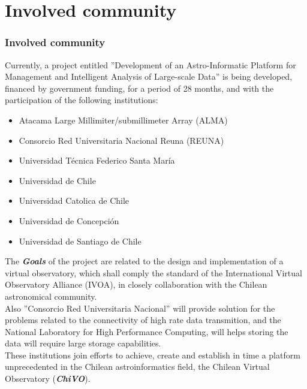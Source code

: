 \section{Involved community}

\begin{frame}
\frametitle{Involved community}
Currently, a project entitled ”Development of an Astro-Informatic Platform for Management and
Intelligent Analysis of Large-scale Data” is being developed, financed by government funding, for a period of 28 months,
and with the participation of the following institutions:
\begin{itemize}
	\addtolength{\itemindent}{1cm}
	\item Atacama Large Millimiter/submillimeter Array (ALMA)
	\item Consorcio Red Universitaria Nacional Reuna (REUNA)
	\item Universidad Técnica Federico Santa María
	\item Universidad de Chile
	\item Universidad Catolica de Chile
	\item Universidad de Concepción
	\item Universidad de Santiago de Chile
\end{itemize}
\end{frame}

\begin{frame}

The \emph{\textbf{Goals}} of the project are related to the design and implementation of a virtual observatory, which
shall comply the standard of the International Virtual Observatory Alliance (IVOA), in closely collaboration with the
Chilean astronomical community.\\
\vspace{0.7cm}
Also ”Consorcio Red Universitaria Nacional” will provide solution for the problems related to the connectivity of high
rate data transmition, and the National Laboratory for High Performance Computing, will helps storing the data will require large storage
capabilities.\\
\vspace{0.7cm}
These institutions join efforts to achieve, create and establish in time a platform unprecedented in the
Chilean astroinformatics field, the Chilean Virtual Observatory (\emph{\textbf{ChiVO}}).
\end{frame}
